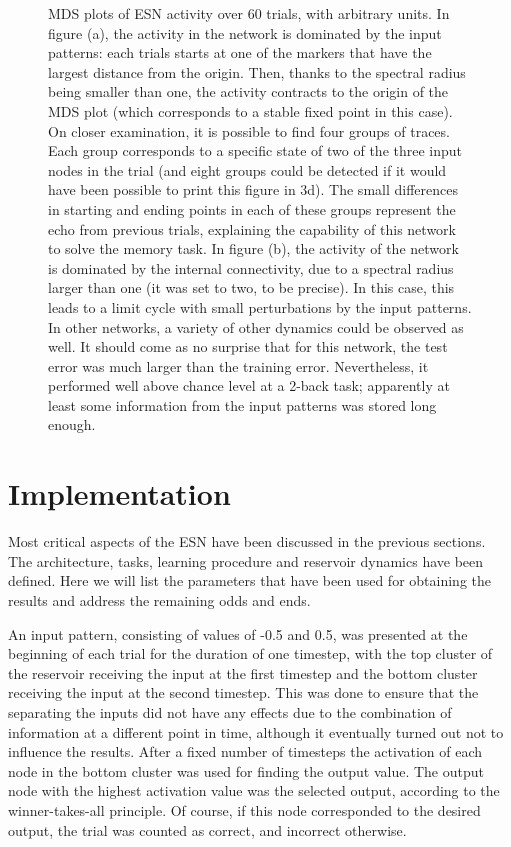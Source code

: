 \documentclass[10pt,a4paper]{report}
\begin{document}
\begin{figure}
\begin{subfigure}[b]{0.5\textwidth}
                \caption{}
        \end{subfigure}
        \caption{MDS plots of ESN activity over 60 trials, with arbitrary units. In figure (a), the activity in the network is dominated by the input patterns: each trials starts at one of the markers that have the largest distance from the origin. Then, thanks to the spectral radius being smaller than one, the activity contracts to the origin of the MDS plot (which corresponds to a stable fixed point in this case). On closer examination, it is possible to find four groups of traces. Each group corresponds to a specific state of two of the three input nodes in the trial (and eight groups could be detected if it would have been possible to print this figure in 3d). The small differences in starting and ending points in each of these groups represent the echo from previous trials, explaining the capability of this network to solve the memory task. In figure (b), the activity of the network is dominated by the internal connectivity, due to a spectral radius larger than one (it was set to two, to be precise). In this case, this leads to a limit cycle with small perturbations by the input patterns. In other networks, a variety of other dynamics could be observed as well. It should come as no surprise that for this network, the test error was much larger than the training error. Nevertheless, it performed well above chance level at a 2-back task; apparently at least some information from the input patterns was stored long enough.}
\label{MDS}
\end{figure}


\section{Implementation}
Most critical aspects of the ESN have been discussed in the previous sections. The architecture, tasks, learning procedure and reservoir dynamics have been defined. Here we will list the parameters that have been used for obtaining the results and address the remaining odds and ends.

An input pattern, consisting of values of -0.5 and 0.5, was presented at the beginning of each trial for the duration of one timestep, with the top cluster of the reservoir receiving the input at the first timestep and the bottom cluster receiving the input at the second timestep. This was done to ensure that the separating the inputs did not have any effects due to the combination of information at a different point in time, although it eventually turned out not to influence the results. After a fixed number of timesteps the activation of each node in the bottom cluster was used for finding the output value. The output node with the highest activation value was the selected output, according to the winner-takes-all principle. Of course, if this node corresponded to the desired output, the trial was counted as correct, and incorrect otherwise.
\end{document}
